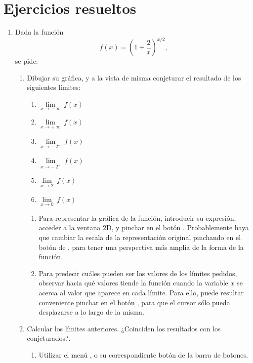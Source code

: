 \section{Ejercicios resueltos}
\begin{enumerate}[leftmargin=*]
\item  Dada la función
\[
f(x)=\left( 1+\frac 2x\right) ^{x/2},
\]
se pide:

\begin{enumerate}
\item  Dibujar su gráfica, y a la vista de misma conjeturar el resultado de los siguientes límites:
\begin{multicols}{2}
\begin{enumerate}
\item  $\lim\limits_{x\rightarrow -\,\infty }\ f(x)$
\item  $\lim\limits_{x\rightarrow +\,\infty }\ f(x)$
\item  $\lim\limits_{x\rightarrow -\,2^{-}}\ f(x)$
\item  $\lim\limits_{x\rightarrow -\,2^{+}}\ f(x)$
\item  $\lim\limits_{x\rightarrow 2}\ f(x)$
\item  $\lim\limits_{x\rightarrow 0}\ f(x)$
\end{enumerate}
\end{multicols}

\begin{indicacion}
\begin{enumerate}
\item Para representar la gráfica de la función, introducir su expresión, acceder a la ventana 2D, y pinchar en el botón . Probablemente haya que cambiar la escala de la representación original pinchando en el botón de , para tener una perspectiva más amplia de la forma de la función.
\item Para predecir cuáles pueden ser los valores de los límites pedidos, observar hacia qué valores tiende la función cuando la variable
$x$ se acerca al valor que aparece en cada límite. Para ello, puede resultar conveniente pinchar en el botón , para
que el cursor sólo pueda desplazarse a lo largo de la misma.
\end{enumerate}
\end{indicacion}

\item  Calcular los límites anteriores. ¿Coinciden los resultados con los conjeturados?.
\begin{indicacion}
\begin{enumerate}
\item Utilizar el menú , o su correspondiente botón de la barra de botones.


\end{enumerate}
\end{indicacion}
\end{enumerate}
\end{enumerate}
